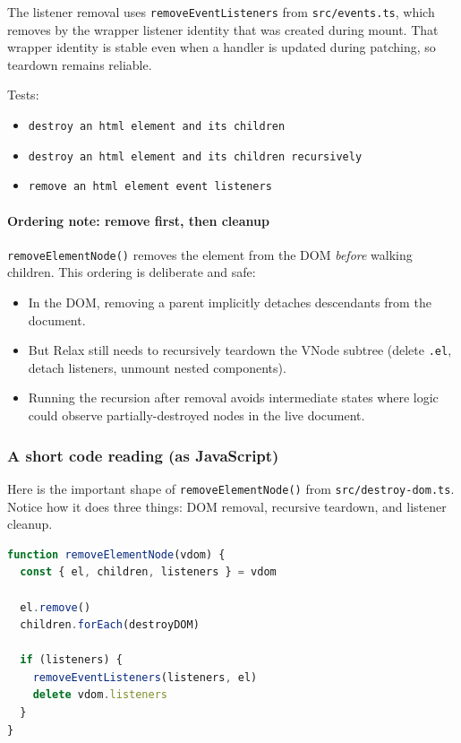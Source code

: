 The listener removal uses \texttt{removeEventListeners} from \texttt{src/events.ts}, which removes by the wrapper listener identity that was created during mount.
That wrapper identity is stable even when a handler is updated during patching, so teardown remains reliable.

Tests:

\begin{itemize}
  \item \texttt{destroy an html element and its children}
  \item \texttt{destroy an html element and its children recursively}
  \item \texttt{remove an html element event listeners}
\end{itemize}

\paragraph{Ordering note: remove first, then cleanup}

	\texttt{removeElementNode()} removes the element from the DOM \emph{before} walking children.
This ordering is deliberate and safe:

\begin{itemize}
  \item In the DOM, removing a parent implicitly detaches descendants from the document.
  \item But Relax still needs to recursively teardown the VNode subtree (delete \texttt{.el}, detach listeners, unmount nested components).
  \item Running the recursion after removal avoids intermediate states where logic could observe partially-destroyed nodes in the live document.
\end{itemize}

\subsubsection{A short code reading (as JavaScript)}

Here is the important shape of \texttt{removeElementNode()} from \texttt{src/destroy-dom.ts}.
Notice how it does three things: DOM removal, recursive teardown, and listener cleanup.

\begin{lstlisting}[style=relax,language=JavaScript]
function removeElementNode(vdom) {
  const { el, children, listeners } = vdom

  el.remove()
  children.forEach(destroyDOM)

  if (listeners) {
    removeEventListeners(listeners, el)
    delete vdom.listeners
  }
}
\end{lstlisting}

